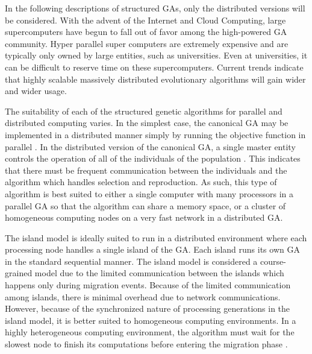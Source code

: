     In the following descriptions of structured GAs, only the distributed versions
      will be considered. 
    With the advent of the Internet and Cloud Computing, large supercomputers
      have begun to fall out of favor among the high-powered GA community.
    Hyper parallel super computers are extremely expensive and are typically only
      owned by large entities, such as universities. 
    Even at universities, it can be difficult to reserve time on these
      supercomputers. 
    Current trends indicate that highly scalable massively distributed
      evolutionary algorithms will gain wider and wider usage.

    The suitability of each of the structured genetic algorithms for parallel
      and distributed computing varies. 
    In the simplest case, the canonical GA may be implemented in a distributed
      manner simply by running the objective function in parallel
      \cite{Schutte2004}. 
    In the distributed version of the canonical GA, a single master entity
      controls the operation of all of the individuals of the population
      \cite{Luque2005}. 
    This indicates that there must be frequent communication between the
      individuals and the algorithm which handles selection and reproduction. 
    As such, this type of algorithm is best suited to either a single computer
      with many processors in a parallel GA so that the algorithm can share a
      memory space, or a cluster of homogeneous computing nodes on a very fast
      network in a distributed GA. 

    The island model is ideally suited to run in a distributed environment where
      each processing node handles a single island of the GA. 
    Each island runs its own GA in the standard sequential manner. 
    The island model is considered a course-grained model \cite{Cantu-Paz1998}
      due to the limited communication between the islands which happens only
      during migration events. 
    Because of the limited communication among islands, there is minimal
      overhead due to network communications. 
    However, because of the synchronized nature of processing generations in
      the island model, it is better suited to homogeneous computing
      environments. 
    In a highly heterogeneous computing environment, the algorithm must wait
      for the slowest node to finish its computations before entering the
      migration phase \cite{Desell2010}.


